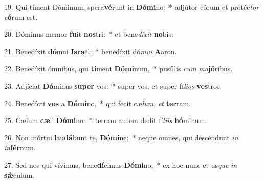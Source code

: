 19. Qui timent Dóminum, spera\textbf{vé}runt in \textbf{Dó}\textbf{mi}no:~*  adjútor eórum et protéc\textit{tor} \textit{e}\textbf{ó}rum est.\

20. Dóminus memor \textbf{fu}it \textbf{nos}tri:~*  et bene\textit{dí}\textit{xit} \textbf{no}bis:\

21. Benedíxit \textbf{dó}mui \textbf{Is}\textbf{ra}ël:~*  benedíxit dó\textit{mu}\textit{i} \textbf{A}aron.\

22. Benedíxit ómnibus, qui \textbf{ti}ment \textbf{Dó}\textbf{mi}num,~*  pusíllis \textit{cum} \textit{ma}\textbf{jó}ribus.\

23. Adjíciat \textbf{Dó}minus \textbf{su}\textbf{per} vos:~*  super vos, et super fí\textit{li}\textit{os} \textbf{ves}tros.\

24. Benedícti \textbf{vos} a \textbf{Dó}\textbf{mi}no,~*  qui fecit cæ\textit{lum}, \textit{et} \textbf{ter}ram.\

25. Cælum \textbf{cæ}li \textbf{Dó}\textbf{mi}no:~*  terram autem dedit fí\textit{li}\textit{is} \textbf{hó}minum.\

26. Non mórtui lau\textbf{dá}bunt te, \textbf{Dó}\textbf{mi}ne:~*  neque omnes, qui descéndunt \textit{in} \textit{in}\textbf{fér}num.\

27. Sed nos qui vívimus, bene\textbf{dí}cimus \textbf{Dó}\textbf{mi}no,~*  ex hoc nunc et us\textit{que} \textit{in} \textbf{sǽ}culum.\

